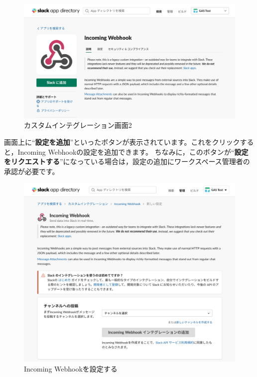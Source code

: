 \documentclass[uplatex,a4j]{jsarticle}
\begin{document}
\begin{figure}[h]
 \centering
 \includegraphics[keepaspectratio, scale=0.6]{images/custom_integration2.png}
 \caption{カスタムインテグレーション画面2}
 \label{fig:custom_integration2}
\end{figure}

画面上に``\textbf{設定を追加}''といったボタンが表示されています。これをクリックすると，Incoming Webhookの設定を追加できます。
ちなみに，このボタンが``\textbf{設定をリクエストする}''になっている場合は，設定の追加にワークスペース管理者の承認が必要です。

\begin{figure}[h]
  \centering
  \includegraphics[keepaspectratio, scale=0.4]{images/configure_incoming_webhook.png}
  \caption{Incoming Webhookを設定する}
 \end{figure}
\end{document}
